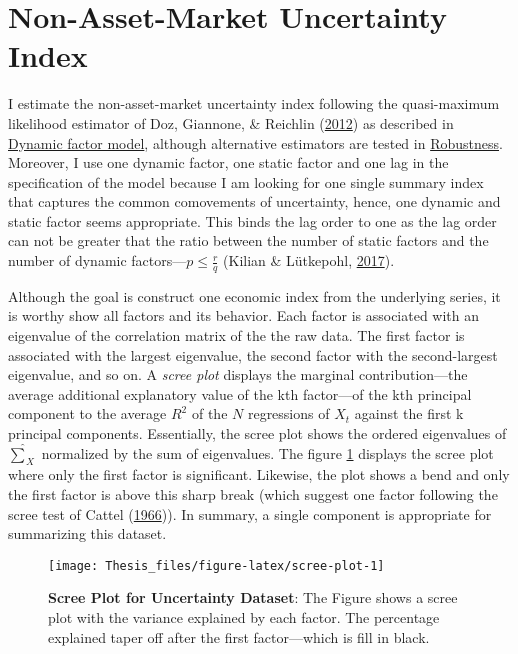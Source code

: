 \documentclass[12pt,twoside]{reedthesis}
\begin{document}
\hypertarget{non-asset-market-uncertainty-index}{%
\section{Non-Asset-Market Uncertainty Index}\label{non-asset-market-uncertainty-index}}

I estimate the non-asset-market uncertainty index following the quasi-maximum likelihood estimator of Doz, Giannone, \& Reichlin (\protect\hyperlink{ref-dozgianreic:2012}{2012}) as described in \protect\hyperlink{dynamic-factor-model}{Dynamic factor model}, although alternative estimators are tested in \protect\hyperlink{robustness}{Robustness}. Moreover, I use one dynamic factor, one static factor and one lag in the specification of the model because I am looking for one single summary index that captures the common comovements of uncertainty, hence, one dynamic and static factor seems appropriate. This binds the lag order to one as the lag order can not be greater that the ratio between the number of static factors and the number of dynamic factors---\(p \le \frac{r}{q}\) (Kilian \& Lütkepohl, \protect\hyperlink{ref-kililutk:2017}{2017}).

Although the goal is construct one economic index from the underlying series, it is worthy show all factors and its behavior. Each factor is associated with an eigenvalue of the correlation matrix of the the raw data. The first factor is associated with the largest eigenvalue, the second factor with the second-largest eigenvalue, and so on. A \emph{scree plot} displays the marginal contribution---the average additional explanatory value of the kth factor---of the kth principal component to the average \(R^{2}\) of the \(N\) regressions of \(X_{t}\) against the first k principal components. Essentially, the scree plot shows the ordered eigenvalues of \(\hat{\sum}_{X}\) normalized by the sum of eigenvalues. The figure \ref{fig:scree-plot} displays the scree plot where only the first factor is significant. Likewise, the plot shows a bend and only the first factor is above this sharp break (which suggest one factor following the scree test of Cattel (\protect\hyperlink{ref-cattel:1966}{1966})). In summary, a single component is appropriate for summarizing this dataset.


\begin{figure}

{\centering \texttt{[image: Thesis\_files/figure-latex/scree-plot-1]} 

}

\caption[Scree Plot for Uncertainty Dataset]{\textbf{Scree Plot for Uncertainty Dataset}: The Figure shows a scree plot with the variance explained by each factor. The percentage explained taper off after the first factor---which is fill in black.}\label{fig:scree-plot}
\end{figure}
\end{document}
